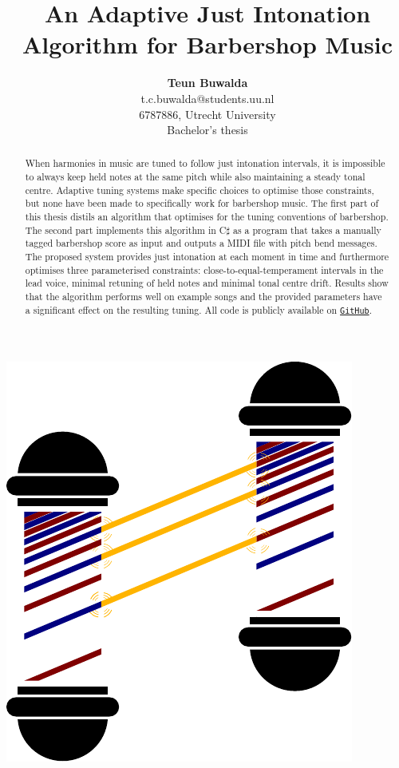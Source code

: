 \documentclass[a4paper]{article}
\title{An Adaptive Just Intonation Algorithm for Barbershop Music}
\author{{\bf Teun Buwalda}\\t.c.buwalda@students.uu.nl\\6787886, Utrecht University\\Bachelor's thesis}
\begin{document}

\begin{titlepage}

\begin{center}
	\includegraphics[height=0.3\textheight]{Figures/poles_logo.pdf}
\end{center}

\vspace{-15pt}

{
	\let\newpage\relax
	\maketitle
}

\begin{abstract}
	When harmonies in music are tuned to follow just intonation intervals, it is impossible to always keep held notes at the same pitch while also maintaining a steady tonal centre. Adaptive tuning systems make specific choices to optimise those constraints, but none have been made to specifically work for barbershop music. The first part of this thesis distils an algorithm that optimises for the tuning conventions of barbershop. The second part implements this algorithm in C$\sharp$ as a program that takes a manually tagged barbershop score as input and outputs a MIDI file with pitch bend messages. The proposed system provides just intonation at each moment in time and furthermore optimises three parameterised constraints: close-to-equal-temperament intervals in the lead voice, minimal retuning of held notes and minimal tonal centre drift. Results show that the algorithm performs well on example songs and the provided parameters have a significant effect on the resulting tuning. All code is publicly available on \texttt{\href{https://GitHub.com/teuncb/AdaptiveBarbershop}{GitHub}}.
\end{abstract}


\end{titlepage}
\end{document}
